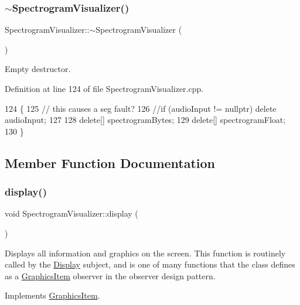 \subsubsection{\texorpdfstring{$\sim$\+Spectrogram\+Visualizer()}{~SpectrogramVisualizer()}}
{\footnotesize\ttfamily Spectrogram\+Visualizer\+::$\sim$\+Spectrogram\+Visualizer (\begin{DoxyParamCaption}{ }\end{DoxyParamCaption})}

Empty destructor. 

Definition at line 124 of file Spectrogram\+Visualizer.\+cpp.


\begin{DoxyCode}
124                                               \{
125     \textcolor{comment}{// this causes a seg fault?}
126     \textcolor{comment}{//if (audioInput != nullptr) delete audioInput;}
127 
128     \textcolor{keyword}{delete}[] spectrogramBytes;
129     \textcolor{keyword}{delete}[] spectrogramFloat;
130 \}
\end{DoxyCode}


\subsection{Member Function Documentation}
\mbox{\label{structSpectrogramVisualizer_a529c64c733ffc564764593329c483ae2}} 
\subsubsection{\texorpdfstring{display()}{display()}}
{\footnotesize\ttfamily void Spectrogram\+Visualizer\+::display (\begin{DoxyParamCaption}{ }\end{DoxyParamCaption})\hspace{0.3cm}{\ttfamily [virtual]}}

Displays all information and graphics on the screen. This function is routinely called by the \mbox{\hyperlink{classDisplay}{Display}} subject, and is one of many functions that the class defines as a \mbox{\hyperlink{classGraphicsItem}{Graphics\+Item}} observer in the observer design pattern. 

Implements \mbox{\hyperlink{classGraphicsItem}{Graphics\+Item}}.



